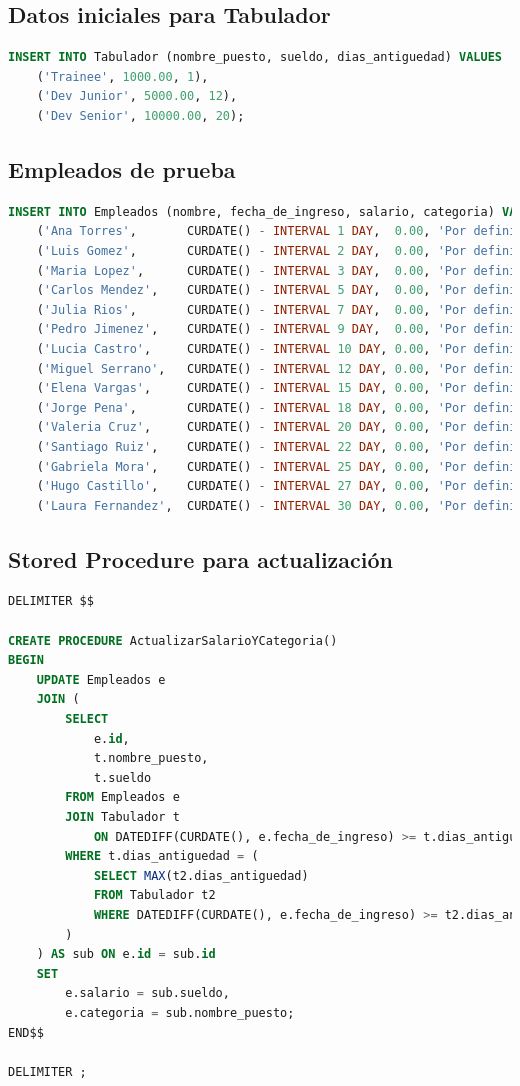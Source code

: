 \documentclass[12pt]{article}
\begin{document}
\subsection*{Datos iniciales para Tabulador}
\begin{lstlisting}[language=SQL]
INSERT INTO Tabulador (nombre_puesto, sueldo, dias_antiguedad) VALUES 
    ('Trainee', 1000.00, 1),
    ('Dev Junior', 5000.00, 12),
    ('Dev Senior', 10000.00, 20);
\end{lstlisting}

\subsection*{Empleados de prueba}
\begin{lstlisting}[language=SQL]
INSERT INTO Empleados (nombre, fecha_de_ingreso, salario, categoria) VALUES
    ('Ana Torres',       CURDATE() - INTERVAL 1 DAY,  0.00, 'Por definir'),
    ('Luis Gomez',       CURDATE() - INTERVAL 2 DAY,  0.00, 'Por definir'),
    ('Maria Lopez',      CURDATE() - INTERVAL 3 DAY,  0.00, 'Por definir'),
    ('Carlos Mendez',    CURDATE() - INTERVAL 5 DAY,  0.00, 'Por definir'),
    ('Julia Rios',       CURDATE() - INTERVAL 7 DAY,  0.00, 'Por definir'),
    ('Pedro Jimenez',    CURDATE() - INTERVAL 9 DAY,  0.00, 'Por definir'),
    ('Lucia Castro',     CURDATE() - INTERVAL 10 DAY, 0.00, 'Por definir'),
    ('Miguel Serrano',   CURDATE() - INTERVAL 12 DAY, 0.00, 'Por definir'),
    ('Elena Vargas',     CURDATE() - INTERVAL 15 DAY, 0.00, 'Por definir'),
    ('Jorge Pena',       CURDATE() - INTERVAL 18 DAY, 0.00, 'Por definir'),
    ('Valeria Cruz',     CURDATE() - INTERVAL 20 DAY, 0.00, 'Por definir'),
    ('Santiago Ruiz',    CURDATE() - INTERVAL 22 DAY, 0.00, 'Por definir'),
    ('Gabriela Mora',    CURDATE() - INTERVAL 25 DAY, 0.00, 'Por definir'),
    ('Hugo Castillo',    CURDATE() - INTERVAL 27 DAY, 0.00, 'Por definir'),
    ('Laura Fernandez',  CURDATE() - INTERVAL 30 DAY, 0.00, 'Por definir');
\end{lstlisting}

\subsection*{Stored Procedure para actualización}
\begin{lstlisting}[language=SQL]
DELIMITER $$

CREATE PROCEDURE ActualizarSalarioYCategoria()
BEGIN
    UPDATE Empleados e
    JOIN (
        SELECT 
            e.id,
            t.nombre_puesto,
            t.sueldo
        FROM Empleados e
        JOIN Tabulador t
            ON DATEDIFF(CURDATE(), e.fecha_de_ingreso) >= t.dias_antiguedad
        WHERE t.dias_antiguedad = (
            SELECT MAX(t2.dias_antiguedad)
            FROM Tabulador t2
            WHERE DATEDIFF(CURDATE(), e.fecha_de_ingreso) >= t2.dias_antiguedad
        )
    ) AS sub ON e.id = sub.id
    SET 
        e.salario = sub.sueldo,
        e.categoria = sub.nombre_puesto;
END$$

DELIMITER ;
\end{lstlisting}
\end{document}

